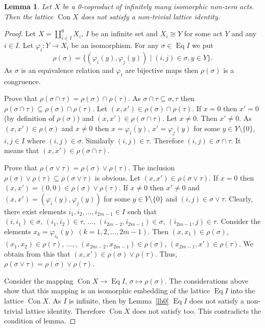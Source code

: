 \documentclass{birkau}
\numberwithin{equation}{section}
\theoremstyle{plain}
\newtheorem{lemma}[theorem]{Lemma}
\theoremstyle{definition}
\DeclareMathOperator{\Con}{Con}
\DeclareMathOperator{\Eq}{Eq}
\begin{document}
	\begin{lemma} \label{lemma:456}
	    Let $X$ be a 0-coproduct of infinitely many isomorphic non-zero acts. Then the lattice $\Con X$ does not satisfy a non-trivial lattice identity.
	\end{lemma}
	\begin{proof}
	    Let $X=\coprod_{i\in I}^0X_i$, $I$ be an infinite set and $X_i\cong Y$ for some act $Y$ and any $i\in I$. Let $\varphi_i: Y\to X_i$ be an isomorphism. For any $\sigma \in \Eq I$ we put $$ \rho(\sigma)= \{ (\varphi_i(y), \varphi_j(y)) \mid (i,j)\in \sigma, y\in Y \}. $$ As $\sigma$ is an equivalence relation and $\varphi_i$ are bijective maps then $\rho(\sigma)$ is a congruence.

        Prove that $\rho(\sigma \cap \tau) = \rho(\sigma) \cap \rho(\tau)$. As $\sigma \cap \tau \subseteq \sigma, \tau$ then $\rho(\sigma \cap \tau) \subseteq \rho(\sigma) \cap \rho(\tau)$. Let $ (x, x') \in \rho(\sigma) \cap \rho(\tau)$. If $x=0$ then $x'=0$ (by definition of $\rho(\sigma)$) and $ (x, x') \in \rho(\sigma \cap \tau)$. Let $x \ne 0$. Then $x' \ne 0$. As $ (x, x') \in \rho(\sigma)$ and $x \ne 0$ then $x=\varphi_i(y)$, $x'=\varphi_j(y)$ for some $y\in Y \setminus \{0\}$, $i,j \in I$ where $(i, j) \in \sigma$. Similarly $(i, j) \in \tau$. Therefore $(i, j)\in \sigma \cap \tau$. It means that $(x, x') \in \rho(\sigma \cap \tau)$.

        Prove that $\rho(\sigma \vee \tau) = \rho(\sigma) \vee \rho(\tau)$.  The inclusion  $\rho(\sigma) \vee \rho(\tau) \subseteq \rho(\sigma \vee \tau)$ is obvious. Let $(x, x') \in \rho(\sigma \vee \tau)$. If $x=0$ then $(x, x') = (0,0) \in \rho(\sigma) \vee \rho(\tau)$. If $x \ne 0$ then $x' \ne 0$ and $(x, x') =(\varphi_i(y), \varphi_j(y))$ for some $y\in Y \setminus \{ 0\}$ and $(i, j) \in \sigma \vee \tau$. Clearly, there exist elements $i_1, i_2, \ldots, i_{2m-1} \in I$ such that $(i, i_1) \in \sigma, \,(i_1, i_2) \in \tau, \, \ldots, \, (i_{2m-2}, i_{2m-1}) \in \sigma, \, (i_{2m-1}, j) \in \tau$. Consider the elements $x_k=\varphi_{i_k}(y)$ $(k=1,2, \ldots, 2m-1)$. Then $(x, x_1) \in \rho(\sigma)$, $(x_1, x_2) \in \rho(\tau)$, $\ldots,$, $(x_{2m-2}, x_{2m-1}) \in \rho(\sigma)$, $(x_{2m-1}, x') \in \rho(\tau)$. We obtain from this that $(x, x') \in \rho(\sigma) \vee \rho(\tau)$. Thus, $\rho(\sigma \vee \tau) = \rho(\sigma) \vee \rho(\tau)$.

        Consider the mapping  $\Con X \to \Eq I$, $\sigma \mapsto \rho(\sigma)$. The considerations above show that this mapping is an isomorphic embedding of the lattice $\Eq I$ into the lattice $\Con X$. As $I$ is infinite, then by Lemma~\ref{lb0} $\Eq I$ does not satisfy a non-trivial lattice identity. Therefore $\Con X$ does not satisfy too. This contradicts the condition of lemma.
	\end{proof}
	
\end{document}
